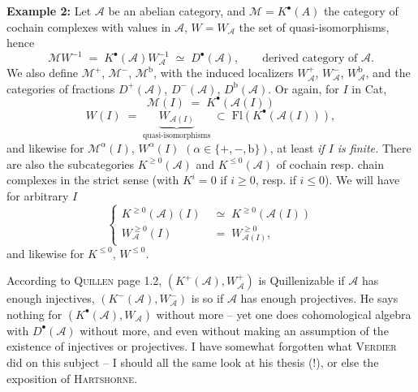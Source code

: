 \documentclass[11pt]{article}
\newcommand{\printedpage}[1]{\marginpar{\footnotesize p.~#1}}
\newcommand{\msp}[1]{\marginpar{\footnotesize [#1]}}
\begin{document}
\textbf{Example 2:} Let $\mathcal{A}$ be an abelian category, and $\mathcal{M} = K^{\bullet}(A)$ the category of cochain complexes with values in $\mathcal{A}$, $W = W_{\mathcal{A}}$ the set of quasi-isomorphisms, hence %
\[ \mathcal{M}W^{-1} \;=\; K^{\bullet}(\mathcal{A})W_{\mathcal{A}}^{-1} \;\simeq\; D^{\bullet}(\mathcal{A}), \qquad \text{derived category of $\mathcal{A}$.} \]
We also define $\mathcal{M}^{+}$, $\mathcal{M}^{-}$, $\mathcal{M}^{\mathrm{b}}$, with the induced localizers $W_{\mathcal{A}}^{+}$, $W_{\mathcal{A}}^{-}$, $W_{\mathcal{A}}^{\mathrm{b}}$, and the categories of fractions $D^{+}(\mathcal{A})$, $D^{-}(\mathcal{A})$, $D^{\mathrm{b}}(\mathcal{A})$. Or
\msp{page 52}again, for $I$ in Cat,
\[ \mathcal{M}(I) \;=\; K^{\bullet}(\mathcal{A}(I)) \]
\printedpage{30}
\[ W(I) \;=\; \underbrace{W_{\mathcal{A}(I)}}_{\text{quasi-isomorphisms}} \;\subset\; \mathrm{Fl}(K^{\bullet}(\mathcal{A}(I))), \]
and likewise for $\mathcal{M}^{\alpha}(I)$, $W^{\alpha}(I)$ $(\alpha \in \{+,-,\mathrm{b}\})$, at least \textit{if $I$ is finite.} There are also the subcategories $K^{\geq 0}(\mathcal{A})$ and $K^{\leq 0}(\mathcal{A})$ of cochain resp. chain complexes in the strict sense (with $K^{i} = 0$ if $i \geq 0$, resp. if $i \leq 0$). We will have for arbitrary $I$
\[ \left\{ \begin{aligned} K^{\geq 0}(\mathcal{A})(I) &\;\simeq\; K^{\geq 0}(\mathcal{A}(I)) \\ W_{\mathcal{A}}^{\geq 0}(I) &\;=\; W_{\mathcal{A}(I)}^{\geq 0}, \end{aligned} \right. \]
and likewise for $K^{\leq 0}$, $W^{\leq 0}$.

According to \textsc{Quillen} page 1.2, $(K^{+}(\mathcal{A}),W_{\mathcal{A}}^{+})$ is Quillenizable if $\mathcal{A}$ has enough injectives, $(K^{-}(\mathcal{A}),W_{\mathcal{A}}^{-})$ is so if $\mathcal{A}$ has enough projectives. He says nothing for $(K^{\bullet}(\mathcal{A}),W_{\mathcal{A}})$ without more -- yet one does cohomological algebra with $D^{\bullet}(\mathcal{A})$ without more, and even without making an assumption of the existence of injectives or projectives. I have somewhat forgotten what \textsc{Verdier} did on this subject -- I should all the same look at his thesis (!), or else the exposition of \textsc{Hartshorne}.
\end{document}
